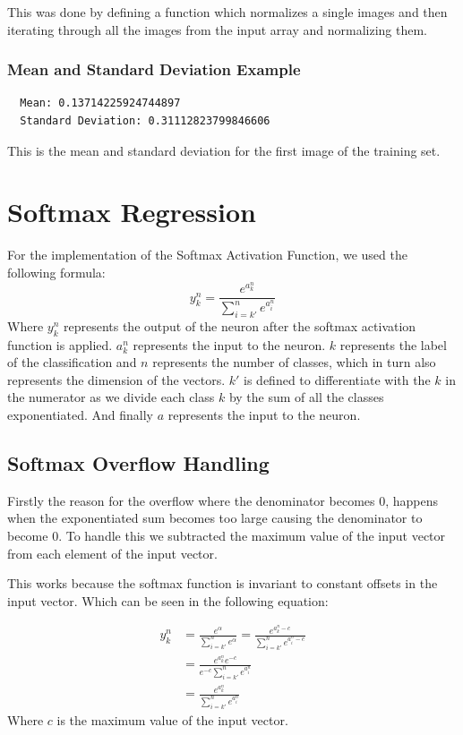 \documentclass{article}
\begin{document}
This was done by defining a function which normalizes a single images and 
then iterating through all the images from the input array and normalizing them.

\subsubsection{Mean and Standard Deviation Example}
\begin{verbatim}
  Mean: 0.13714225924744897
  Standard Deviation: 0.31112823799846606
\end{verbatim}
This is the mean and standard deviation for the first image of the 
training set.

\section{Softmax Regression}
For the implementation of the Softmax Activation Function, we used the following formula:
\begin{equation}
  y_k^n = \frac{\displaystyle e^{a^n_k}}{\sum_{i = k'}^{n} e^{a^n_i}}
\end{equation}
Where $y_k^n$ represents the output of the neuron after the softmax activation function 
is applied. $a^n_k$ represents the input to the neuron. $k$ represents the label of the 
classification and $n$ represents the number of classes, which in turn also represents the
dimension of the vectors. $k'$ is defined to differentiate with the $k$ in the numerator as 
we divide each class $k$ by the sum of all the classes exponentiated. And finally $a$ 
represents the input to the neuron.

\subsection{Softmax Overflow Handling}
Firstly the reason for the overflow where the denominator becomes 0, happens when the
exponentiated sum becomes too large causing the denominator to become 0. To handle this
we subtracted the maximum value of the input vector from each element of the input vector.

This works because the softmax function is invariant to constant offsets in the input vector.
Which can be seen in the following equation:

\begin{equation}
  \begin{split}
    y_k^n &= \frac{e^{\alpha}}{\sum_{i = k'}^{n} e^{\alpha}} = \frac{e^{a^n_k - c}}{\sum_{i = k'}^{n} e^{a^n_i - c}} \\
    &= \frac{e^{a^n_k}e^{-c}}{e^{-c}\sum_{i = k'}^{n} e^{a^n_i}} \\
    &= \frac{e^{a^n_k}}{\sum_{i = k'}^{n} e^{a^n_i}}
  \end{split}
\end{equation}
Where $c$ is the maximum value of the input vector.
\end{document}
